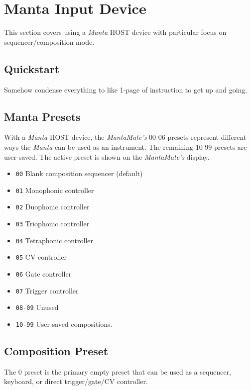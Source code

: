 \renewcommand{\chaptername}{Section}
\chapter{Manta Input Device}

\begin{intro}
  This section covers using a \emph{Manta} HOST device with particular
  focus on sequencer/composition mode.
\end{intro}

\section{Quickstart}

  Somehow condense everything to like 1-page of instruction to get up and going.


\section{Manta Presets}
  With a \emph{Manta} HOST device, the \emph{MantaMate's} 00-06 presets
  represent different ways the \emph{Manta} can be used as an instrument. The
  remaining 10-99 presets are user-saved.
   The active preset is shown on the \emph{MantaMate's} display.

  \begin{itemize}
    \item \texttt{00} Blank composition sequencer (default)
    \item \texttt{01} Monophonic controller
    \item \texttt{02} Duophonic controller
    \item \texttt{03} Triophonic controller
    \item \texttt{04} Tetraphonic controller
    \item \texttt{05} CV controller
    \item \texttt{06} Gate controller
    \item \texttt{07} Trigger controller
    \item \texttt{08-09} Unused
    \item \texttt{10-99} User-saved compositions.
  \end{itemize}

\section{Composition Preset}
  The 0 preset is the primary empty preset that can be used as a sequencer, keyboard, or
  direct trigger/gate/CV controller.

